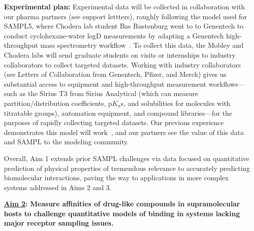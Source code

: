 \documentclass[11pt]{article}
\begin{document}
{\bf Experimental plan:}
Experimental data will be collected in collaboration with our pharma partners (see support lettters), roughly following the model used for SAMPL5, where Chodera lab student Bas Rustenburg went to to Genentech to conduct cyclohexane-water logD measurements by adapting a Genentech high-throughput mass spectrometry workflow~\cite{rustenburg_measuring_2016}.
To collect this data, the Mobley and Chodera labs will send graduate students on visits or internships to industry collaborators to collect targeted datasets.
Working with industry collaborators (see Letters of Collaboration from Genentech, Pfizer, and Merck) gives us substantial access to equipment and high-throughput measurement workflows---such as the Sirius T3 from Sirius Analytical (which can measure partition/distribution coefficients, p$K_a$s, and solubilities for molecules with titratable groups), automation equipment, and compound libraries---for the purposes of rapidly collecting targeted datasets.
Our previous experience demonstrates this model will work~\cite{rustenburg_measuring_2016}, and our partners see the value of this data and SAMPL to the modeling community.

Overall, Aim 1 extends prior SAMPL challenges via data focused on quantitative prediction of physical properties of tremendous relevance to accurately predicting biomolecular interactions, paving the way to applications in more complex systems addressed in Aims 2 and 3.

\textbf{\underline{Aim 2}: Measure affinities of drug-like compounds in supramolecular hosts to challenge quantitative models of binding in systems lacking major receptor sampling issues.}
\end{document}
